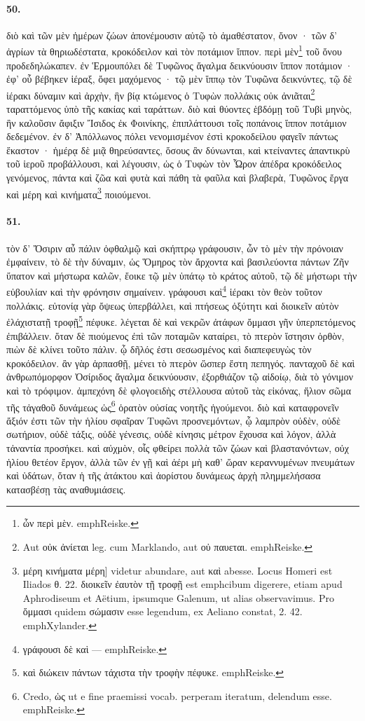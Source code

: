 \documentclass[a4paper, 11pt, oneside, polutonikogreek, german]{article}
\begin{document}
\paragraph{50.}
διὸ καὶ τῶν μὲν ἡμέρων ζώων ἀπονέμουσιν αὐτῷ τὸ ἀμαθέστατον, ὄνον · τῶν δ' ἀγρίων τὰ θηριωδέστατα, κροκόδειλον καὶ τὸν ποτάμιον ἵππον. περὶ μὲν\footnote{ὧν περὶ μὲν. emph{Reiske.}} τοῦ ὄνου προδεδηλώκαπεν. ἐν Ἑρμουπόλει δὲ Τυφῶνος ἄγαλμα δεικνύουσιν ἵππον ποτάμιον · ἐφ' οὗ βέβηκεν ἱέραξ, ὄφει μαχόμενος · τῷ μὲν ἵππῳ τὸν Τυφῶνα δεικνύντες, τῷ δὲ ἱέρακι δύναμιν καὶ ἀρχὴν, ἣν βίᾳ κτώμενος ὁ Τυφὼν πολλάκις οὐκ ἀνιᾶται\footnote{Aut οὐκ ἀνίεται leg. cum Marklando, aut οὐ παυεται. emph{Reiske.}} ταραττόμενος ὑπὸ τῆς κακίας καὶ ταράττων. διὸ καὶ θύοντες ἑβδόμῃ τοῦ Τυβὶ μηνὸς, ἣν καλοῦσιν ἄφιξιν Ἴσιδος ἐκ Φοινίκης, ἐπιπλάττουσι τοῖς ποπάνοις ἵππον ποτάμιον δεδεμένον. ἐν δ' Ἀπόλλωνος πόλει νενομισμένον ἐστὶ κροκοδείλου φαγεῖν πάντως ἕκαστον · ἡμέρᾳ δὲ μιᾷ θηρεύσαντες, ὅσους ἂν δύνωνται, καὶ κτείναντες ἀπαντικρὺ τοῦ ἱεροῦ προβάλλουσι, καὶ λέγουσιν, ὡς ὁ Τυφὼν τὸν Ὧρον ἀπέδρα κροκόδειλος γενόμενος, πάντα καὶ ζῶα καὶ φυτὰ καὶ πάθη τὰ φαῦλα καὶ βλαβερὰ, Τυφῶνος ἔργα καὶ μέρη καὶ κινήματα\footnote{μέρη κινήματα μέρη] videtur abundare, aut καὶ abesse. Locus Homeri est Iliados θ. 22. διοικεῖν ἐαυτὸν τῇ τροφῇ est emph{cibum digerere}, etiam apud Aphrodiseum et Aëtium, ipsumque Galenum, ut alias observavimus. Pro ὄμμασι quidem σώμασιν esse legendum, ex Aeliano constat, 2. 42. emph{Xylander.}} ποιούμενοι.

\paragraph{51.}
τὸν δ' Ὄσιριν αὖ πάλιν ὀφθαλμῷ καὶ σκήπτρῳ γράφουσιν, ὧν τὸ μὲν τὴν πρόνοιαν ἐμφαίνειν, τὸ δὲ τὴν δύναμιν, ὡς Ὅμηρος τὸν ἄρχοντα καὶ βασιλεύοντα πάντων Ζῆν ὕπατον καὶ μήστωρα καλῶν, ἔοικε τῷ μὲν ὑπάτῳ τὸ κράτος αὐτοῦ, τῷ δὲ μήστωρι τὴν εὐβουλίαν καὶ τὴν φρόνησιν σημαίνειν. γράφουσι καὶ\footnote{γράφουσι δὲ καὶ --- emph{Reiske.}} ἱέρακι τὸν θεὸν τοῦτον πολλάκις. εὐτονίᾳ γὰρ ὄψεως ὑπερβάλλει, καὶ πτήσεως ὀξύτητι καὶ διοικεῖν αὑτὸν ἐλάχιστατῇ τροφῇ\footnote{καὶ διώκειν πάντων τάχιστα τὴν τροφὴν πέφυκε. emph{Reiske.}} πέφυκε. λέγεται δὲ καὶ νεκρῶν ἀτάφων ὄμμασι γῆν ὑπερπετόμενος ἐπιβάλλειν. ὅταν δὲ πιούμενος ἐπὶ τῶν ποταμῶν καταίρει, τὸ πτερὸν ἵστησιν ὀρθὸν, πιὼν δὲ κλίνει τοῦτο πάλιν. ᾧ δῆλός ἐστι σεσωσμένος καὶ διαπεφευγὼς τὸν κροκόδειλον. ἂν γὰρ ἁρπασθῇ, μένει τὸ πτερὸν ὥσπερ ἔστη πεπηγός. πανταχοῦ δὲ καὶ ἀνθρωπόμορφον Ὀσίριδος ἄγαλμα δεικνύουσιν, ἐξορθιάζον τῷ αἰδοίῳ, διὰ τὸ γόνιμον καὶ τὸ τρόφιμον. ἀμπεχόνη δὲ φλογοειδὴς στέλλουσα αὐτοῦ τὰς εἰκόνας, ἥλιον σῶμα τῆς τἀγαθοῦ δυνάμεως ὡς\footnote{Credo, ὡς ut e fine praemissi vocab. perperam iteratum, delendum esse. emph{Reiske.}} ὁρατὸν οὐσίας νοητῆς ἡγούμενοι. διὸ καὶ καταφρονεῖν ἄξιόν ἐστι τῶν τὴν ἡλίου σφαῖραν Τυφῶνι προσνεμόντων, ᾧ λαμπρὸν οὐδὲν, οὐδὲ σωτήριον, οὐδὲ τάξις, οὐδὲ γένεσις, οὐδὲ κίνησις μέτρον ἔχουσα καὶ λόγον, ἀλλὰ τἀναντία προσήκει. καὶ αὐχμὸν, οἷς φθείρει πολλὰ τῶν ζώων καὶ βλαστανόντων, οὐχ ἡλίου θετέον ἔργον, ἀλλὰ τῶν ἐν γῇ καὶ ἀέρι μὴ καθ' ὥραν κεραννυμένων πνευμάτων καὶ ὑδάτων, ὅταν ἡ τῆς ἀτάκτου καὶ ἀορίστου δυνάμεως ἀρχὴ πλημμελήσασα κατασβέσῃ τὰς αναθυμιάσεις.
\end{document}

